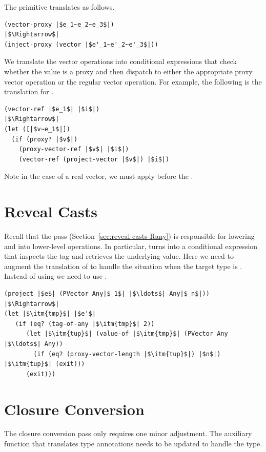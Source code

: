 \documentclass[7x10,nocrop]{TimesAPriori_MIT}%
\begin{document}
The  primitive translates as follows.
\begin{lstlisting}
(vector-proxy |$e_1~e_2~e_3$|)
|$\Rightarrow$|
(inject-proxy (vector |$e'_1~e'_2~e'_3$|))
\end{lstlisting}

We translate the vector operations into conditional expressions that
check whether the value is a proxy and then dispatch to either the
appropriate proxy vector operation or the regular vector operation.
For example, the following is the translation for .
\begin{lstlisting}
(vector-ref |$e_1$| |$i$|)
|$\Rightarrow$|
(let ([|$v~e_1$|])
  (if (proxy? |$v$|)
    (proxy-vector-ref |$v$| |$i$|)
    (vector-ref (project-vector |$v$|) |$i$|)
\end{lstlisting}
Note in the case of a real vector, we must apply 
before the .

\section{Reveal Casts}
\label{sec:reveal-casts-gradual}

Recall that the  pass
(Section~\ref{sec:reveal-casts-Rany}) is responsible for lowering
 and  into lower-level operations.  In
particular,  turns into a conditional expression that
inspects the tag and retrieves the underlying value.  Here we need to
augment the translation of  to handle the situation when
the target type is .  Instead of using
 we need to use .
\begin{lstlisting}
(project |$e$| (PVector Any|$_1$| |$\ldots$| Any|$_n$|))
|$\Rightarrow$|
(let |$\itm{tmp}$| |$e'$|
   (if (eq? (tag-of-any |$\itm{tmp}$| 2))
      (let |$\itm{tup}$| (value-of |$\itm{tmp}$| (PVector Any |$\ldots$| Any))
        (if (eq? (proxy-vector-length |$\itm{tup}$|) |$n$|) |$\itm{tup}$| (exit)))
      (exit)))
\end{lstlisting}


\section{Closure Conversion}
\label{sec:closure-conversion-gradual}

The closure conversion pass only requires one minor adjustment.  The
auxiliary function that translates type annotations needs to be
updated to handle the  type.
\end{document}
